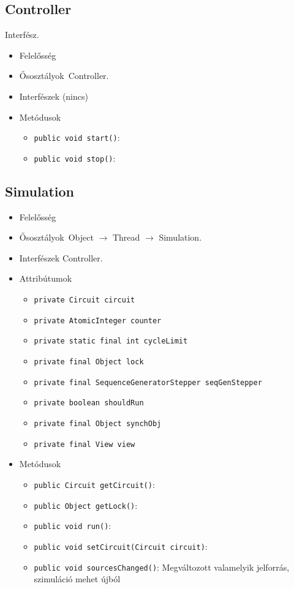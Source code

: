 \subsection{Controller}
Interfész.
\begin{itemize}
\item Felelősség\\

\item Ősosztályok\ Controller.
\item Interfészek (nincs)
\item Metódusok$\ $
\begin{itemize}
	\item \texttt{public void start()}: 
	\item \texttt{public void stop()}: 
\end{itemize}
\end{itemize}

\subsection{Simulation}
\begin{itemize}
\item Felelősség\\

\item Ősosztályok\ Object $\rightarrow{}$ Thread $\rightarrow{}$ Simulation.
\item Interfészek Controller.
\item Attribútumok $\ $
\begin{itemize}
	\item \texttt{private Circuit circuit} 
	\item \texttt{private AtomicInteger counter} 
	\item \texttt{private static final int cycleLimit} 
	\item \texttt{private final Object lock} 
	\item \texttt{private final SequenceGeneratorStepper seqGenStepper} 
	\item \texttt{private boolean shouldRun} 
	\item \texttt{private final Object synchObj} 
	\item \texttt{private final View view} 
\end{itemize}
\item Metódusok$\ $
\begin{itemize}
	\item \texttt{public Circuit getCircuit()}: 
	\item \texttt{public Object getLock()}: 
	\item \texttt{public void run()}: 
	\item \texttt{public void setCircuit(Circuit circuit)}: 
	\item \texttt{public void sourcesChanged()}: Megváltozott valamelyik jelforrás, szimuláció mehet újból
\end{itemize}
\end{itemize}

